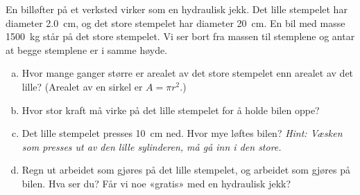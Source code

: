 %
En billøfter på et verksted virker som en hydraulisk jekk. Det lille stempelet har diameter \SI{2.0}{\centi\metre}, og det store stempelet har diameter \SI{20}{\centi\metre}. En bil med masse \SI{1500}{\kilo\gram} står på det store stempelet. Vi ser bort fra massen til stemplene og antar at begge stemplene er i samme høyde.
\begin{enumerate}[a)]
    \item Hvor mange ganger større er arealet av det store stempelet enn arealet av det lille? (Arealet av en sirkel er $A = \pi r^2$.)
    \item Hvor stor kraft må virke på det lille stempelet for å holde bilen oppe?
    \item Det lille stempelet presses \SI{10}{\centi\metre} ned. Hvor mye løftes bilen? \textit{Hint: Væsken som presses ut av den lille sylinderen, må gå inn i den store.}
    \item Regn ut arbeidet som gjøres på det lille stempelet, og arbeidet som gjøres på bilen. Hva ser du? Får vi noe «gratis» med en hydraulisk jekk?
\end{enumerate}
%
